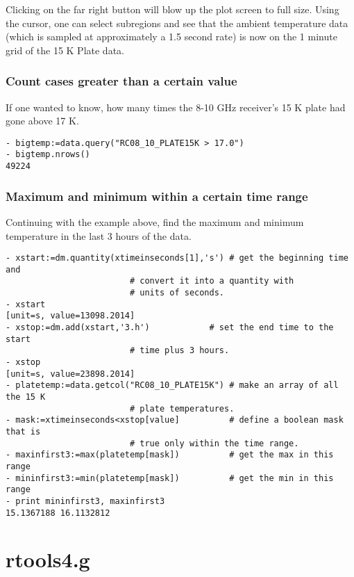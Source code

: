 Clicking on the far right button will blow up the plot screen to full
size. Using the cursor, one can select subregions and see that the
ambient temperature data (which is sampled at approximately a 1.5 second
rate) is now on the 1 minute grid of the 15 K Plate data.

\subsubsection{Count cases greater than a certain value}

If one wanted to know, how many times the 8-10 GHz receiver's 15 K plate
had gone above 17 K.

\begin{verbatim}
- bigtemp:=data.query("RC08_10_PLATE15K > 17.0")
- bigtemp.nrows()
49224 
\end{verbatim}

\subsubsection{Maximum and minimum within a certain time range}

Continuing with the example above, find the maximum and minimum temperature
in the last 3 hours of the data.

\begin{verbatim}
- xstart:=dm.quantity(xtimeinseconds[1],'s') # get the beginning time and 
					     # convert it into a quantity with
					     # units of seconds.
- xstart
[unit=s, value=13098.2014] 
- xstop:=dm.add(xstart,'3.h')		     # set the end time to the start
					     # time plus 3 hours.
- xstop
[unit=s, value=23898.2014]
- platetemp:=data.getcol("RC08_10_PLATE15K") # make an array of all the 15 K
					     # plate temperatures.
- mask:=xtimeinseconds<xstop[value]          # define a boolean mask that is
					     # true only within the time range.
- maxinfirst3:=max(platetemp[mask])          # get the max in this range
- mininfirst3:=min(platetemp[mask])          # get the min in this range
- print mininfirst3, maxinfirst3
15.1367188 16.1132812
\end{verbatim}

\section{rtools4.g}
%

